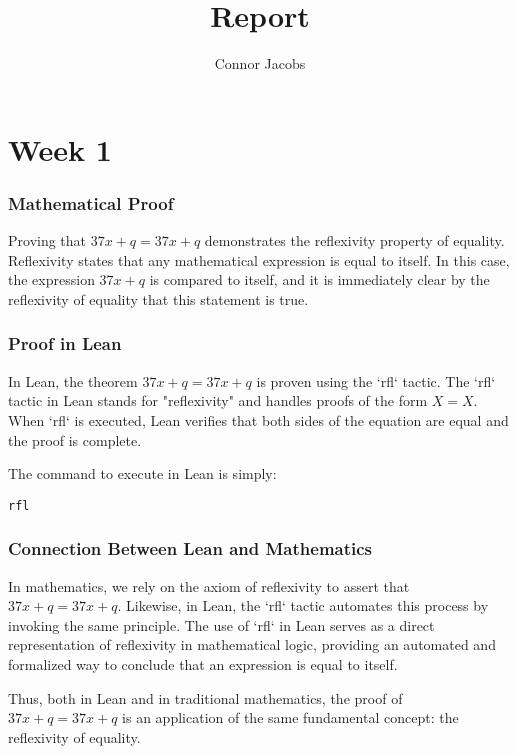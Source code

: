 \documentclass{article}
\title{Report}
\author{Connor Jacobs}
\date{}
\begin{document}
\maketitle
\newpage

\tableofcontents
\newpage

\section*{Week 1}


\subsubsection*{Mathematical Proof}

Proving that $37x + q = 37x + q$ demonstrates the reflexivity property of equality. Reflexivity states that any mathematical expression is equal to itself. In this case, the expression $37x + q$ is compared to itself, and it is immediately clear by the reflexivity of equality that this statement is true.

\subsubsection*{Proof in Lean}

In Lean, the theorem $37x + q = 37x + q$ is proven using the `rfl` tactic. The `rfl` tactic in Lean stands for "reflexivity" and handles proofs of the form $X = X$. When `rfl` is executed, Lean verifies that both sides of the equation are equal and the proof is complete.

The command to execute in Lean is simply:
\begin{verbatim}
rfl
\end{verbatim}

\subsubsection*{Connection Between Lean and Mathematics}

In mathematics, we rely on the axiom of reflexivity to assert that $37x + q = 37x + q$. Likewise, in Lean, the `rfl` tactic automates this process by invoking the same principle. The use of `rfl` in Lean serves as a direct representation of reflexivity in mathematical logic, providing an automated and formalized way to conclude that an expression is equal to itself.

Thus, both in Lean and in traditional mathematics, the proof of $37x + q = 37x + q$ is an application of the same fundamental concept: the reflexivity of equality.
\end{document}
